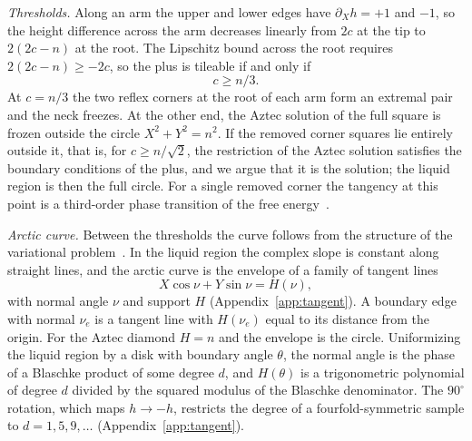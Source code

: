 \documentclass[reprint,aps,prb,floatfix,longbibliography,amsmath,amssymb]{revtex4-2}
\begin{document}
\emph{Thresholds.} Along an arm the upper and lower edges have $\partial_Xh=+1$ and $-1$, so the height difference across the arm decreases linearly from $2c$ at the tip to $2(2c-n)$ at the root. The Lipschitz bound across the root requires $2(2c-n)\ge-2c$, so the plus is tileable if and only if
\begin{equation}\label{eq:third}
  c\ge n/3 .
\end{equation}
At $c=n/3$ the two reflex corners at the root of each arm form an extremal pair and the neck freezes. At the other end, the Aztec solution of the full square is frozen outside the circle $X^2+Y^2=n^2$. If the removed corner squares lie entirely outside it, that is, for $c\ge n/\sqrt2$, the restriction of the Aztec solution satisfies the boundary conditions of the plus, and we argue that it is the solution; the liquid region is then the full circle. For a single removed corner the tangency at this point is a third-order phase transition of the free energy~\cite{ColomoPronko2013}.

\emph{Arctic curve.} Between the thresholds the curve follows from the structure of the variational problem~\cite{Kenyon2007}. In the liquid region the complex slope is constant along straight lines, and the arctic curve is the envelope of a family of tangent lines
\begin{equation}\label{eq:tangent}
  X\cos\nu+Y\sin\nu=H(\nu),
\end{equation}
with normal angle $\nu$ and support $H$ (Appendix~\ref{app:tangent}). A boundary edge with normal $\nu_e$ is a tangent line with $H(\nu_e)$ equal to its distance from the origin. For the Aztec diamond $H=n$ and the envelope is the circle. Uniformizing the liquid region by a disk with boundary angle $\theta$, the normal angle is the phase of a Blaschke product of some degree $d$, and $H(\theta)$ is a trigonometric polynomial of degree $d$ divided by the squared modulus of the Blaschke denominator. The $90^\circ$ rotation, which maps $h\to-h$, restricts the degree of a fourfold-symmetric sample to $d=1,5,9,\dots$ (Appendix~\ref{app:tangent}).
\end{document}

